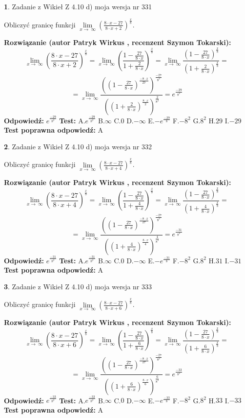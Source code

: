 \documentclass[12pt, a4paper]{article}
\theoremstyle{definition} %
\newtheorem{zad}{}
\newcommand{\zadStart}[1]{\begin{zad}#1\newline}
\newcommand{\zadStop}{\end{zad}}
\newcommand{\rozwStart}[2]{\noindent \textbf{Rozwiązanie (autor #1 , recenzent #2): }\newline}
\newcommand{\rozwStop}{\newline}
\newcommand{\odpStart}{\noindent \textbf{Odpowiedź:}\newline}
\newcommand{\odpStop}{\newline}
\newcommand{\testStart}{\noindent \textbf{Test:}\newline}
\newcommand{\testStop}{\newline}
\newcommand{\kluczStart}{\noindent \textbf{Test poprawna odpowiedź:}\newline}
\newcommand{\kluczStop}{\newline}
\begin{document}
\zadStart{Zadanie z Wikieł Z 4.10 d) moja wersja nr 331}


Obliczyć granicę funkcji  $\lim\limits_{x\to\ \infty}(\frac{8\cdot x-27}{8\cdot x+2})^{\frac{x}{8}}$.
\zadStop
\rozwStart{Patryk Wirkus}{Szymon Tokarski}
$$\lim\limits_{x\to\ \infty}(\frac{8\cdot x-27}{8\cdot x+2})^{\frac{x}{8}} = \lim\limits_{x\to\ \infty}(\frac{1-\frac{27}{8\cdot x}}{1+\frac{2}{8\cdot x}})^{\frac{x}{8}}=\lim\limits_{x\to\ \infty}\frac{(1-\frac{27}{8\cdot x})^{\frac{x}{8}}}{(1+\frac{2}{8\cdot x})^{\frac{x}{8}}}=$$
$$=\lim\limits_{x\to\ \infty}\frac{((1-\frac{27}{8\cdot x})^{\frac{-8\cdot x}{27}})^{\frac{-27}{8^{2}}}}{((1+\frac{2}{8\cdot x})^{\frac{8\cdot x}{2}})^{\frac{2}{8^{2}}}}=e^{\frac{-29}{8^{2}}}$$
\rozwStop
\odpStart
$e^{\frac{-29}{8^{2}}}$
\odpStop
\testStart
A.$e^{\frac{-29}{8^{2}}}$ B.$\infty$ C.$0$ D.$-\infty$ E.$-e^{\frac{-29}{8}}$
F.$-8^{2}$ G.$8^{2}$
H.$29$
I.$-29$
\testStop
\kluczStart
A
\kluczStop



\zadStart{Zadanie z Wikieł Z 4.10 d) moja wersja nr 332}


Obliczyć granicę funkcji  $\lim\limits_{x\to\ \infty}(\frac{8\cdot x-27}{8\cdot x+4})^{\frac{x}{8}}$.
\zadStop
\rozwStart{Patryk Wirkus}{Szymon Tokarski}
$$\lim\limits_{x\to\ \infty}(\frac{8\cdot x-27}{8\cdot x+4})^{\frac{x}{8}} = \lim\limits_{x\to\ \infty}(\frac{1-\frac{27}{8\cdot x}}{1+\frac{4}{8\cdot x}})^{\frac{x}{8}}=\lim\limits_{x\to\ \infty}\frac{(1-\frac{27}{8\cdot x})^{\frac{x}{8}}}{(1+\frac{4}{8\cdot x})^{\frac{x}{8}}}=$$
$$=\lim\limits_{x\to\ \infty}\frac{((1-\frac{27}{8\cdot x})^{\frac{-8\cdot x}{27}})^{\frac{-27}{8^{2}}}}{((1+\frac{4}{8\cdot x})^{\frac{8\cdot x}{4}})^{\frac{4}{8^{2}}}}=e^{\frac{-31}{8^{2}}}$$
\rozwStop
\odpStart
$e^{\frac{-31}{8^{2}}}$
\odpStop
\testStart
A.$e^{\frac{-31}{8^{2}}}$ B.$\infty$ C.$0$ D.$-\infty$ E.$-e^{\frac{-31}{8}}$
F.$-8^{2}$ G.$8^{2}$
H.$31$
I.$-31$
\testStop
\kluczStart
A
\kluczStop



\zadStart{Zadanie z Wikieł Z 4.10 d) moja wersja nr 333}


Obliczyć granicę funkcji  $\lim\limits_{x\to\ \infty}(\frac{8\cdot x-27}{8\cdot x+6})^{\frac{x}{8}}$.
\zadStop
\rozwStart{Patryk Wirkus}{Szymon Tokarski}
$$\lim\limits_{x\to\ \infty}(\frac{8\cdot x-27}{8\cdot x+6})^{\frac{x}{8}} = \lim\limits_{x\to\ \infty}(\frac{1-\frac{27}{8\cdot x}}{1+\frac{6}{8\cdot x}})^{\frac{x}{8}}=\lim\limits_{x\to\ \infty}\frac{(1-\frac{27}{8\cdot x})^{\frac{x}{8}}}{(1+\frac{6}{8\cdot x})^{\frac{x}{8}}}=$$
$$=\lim\limits_{x\to\ \infty}\frac{((1-\frac{27}{8\cdot x})^{\frac{-8\cdot x}{27}})^{\frac{-27}{8^{2}}}}{((1+\frac{6}{8\cdot x})^{\frac{8\cdot x}{6}})^{\frac{6}{8^{2}}}}=e^{\frac{-33}{8^{2}}}$$
\rozwStop
\odpStart
$e^{\frac{-33}{8^{2}}}$
\odpStop
\testStart
A.$e^{\frac{-33}{8^{2}}}$ B.$\infty$ C.$0$ D.$-\infty$ E.$-e^{\frac{-33}{8}}$
F.$-8^{2}$ G.$8^{2}$
H.$33$
I.$-33$
\testStop
\kluczStart
A
\kluczStop
\end{document}
